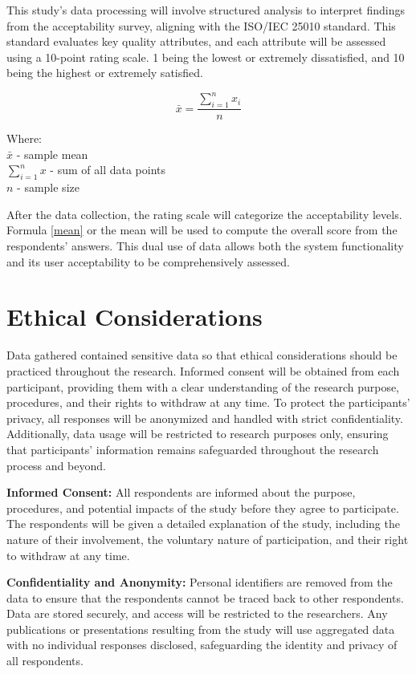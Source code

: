 	This study's data processing will involve structured analysis to interpret findings from the acceptability survey, aligning with the ISO/IEC 25010 standard. This standard evaluates key quality attributes, and each attribute will be assessed using a 10-point rating scale. 1 being the lowest or extremely dissatisfied, and 10 being the highest or extremely satisfied. 
	
	\begin{equation} 
		\label{mean}
		\bar{x} = \frac{\sum_{i=1}^{n} x_{i}}{n}
	\end{equation}
	
	Where:
	\\$\bar{x}$ - sample mean
	\\$\sum_{i=1}^{n} x$ - sum of all data points
	\\$n$ - sample size
	
	
	After the data collection, the rating scale will categorize the acceptability levels. Formula \ref{mean} or the mean will be used to compute the overall score from the respondents' answers. This dual use of data allows both the system functionality and its user acceptability to be comprehensively assessed. 

\section{Ethical Considerations}
	Data gathered contained sensitive data so that ethical considerations should be practiced throughout the research.  Informed consent will be obtained from each participant, providing them with a clear understanding of the research purpose, procedures, and their rights to withdraw at any time. To protect the participants’ privacy, all responses will be anonymized and handled with strict confidentiality. Additionally, data usage will be restricted to research purposes only, ensuring that participants' information remains safeguarded throughout the research process and beyond. 
	
	\textbf{Informed Consent:} All respondents are informed about the purpose, procedures, and potential impacts of the study before they agree to participate. The respondents will be given a detailed explanation of the study, including the nature of their involvement, the voluntary nature of participation, and their right to withdraw at any time.
	
	\textbf{Confidentiality and Anonymity:} Personal identifiers are removed from the data to ensure that the respondents cannot be traced back to other respondents. Data are stored securely, and access will be restricted to the researchers. Any publications or presentations resulting from the study will use aggregated data with no individual responses disclosed, safeguarding the identity and privacy of all respondents.
	
